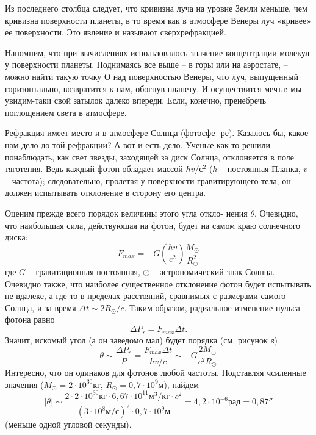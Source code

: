 \begin{multicols}{2}
        \normalsize
        \par
        Из последнего столбца следует, что кривизна луча на уровне Земли меньше, чем кривизна поверхности планеты, в то время как в атмосфере Венеры луч «кривее» ее поверхности. Это явление и называют сверхрефракцией.
        \par
        Напомним, что при вычислениях использовалось значение концентрации молекул у поверхности планеты. Поднимаясь все выше – в горы или на аэростате, – можно найти такую точку О над поверхностью Венеры, что луч, выпущенный горизонтально, возвратится к нам, обогнув планету. И осуществится мечта: мы увидим-таки свой затылок далеко впереди. Если, конечно, пренебречь поглощением света в атмосфере.
        \par
        Рефракция имеет место и в атмосфере Солнца (фотосфе- ре). Казалось бы, какое нам дело до той рефракции? А вот и есть дело. Ученые как-то решили понаблюдать, как свет звезды, заходящей за диск Солнца, отклоняется в поле тяготения. Ведь каждый фотон обладает массой $hv/\textit{с}^2$
        ($h$ – постоянная Планка, $v$ – частота); следовательно, пролетая у поверхности гравитирующего тела, он должен испытывать отклонение в сторону его центра.
        \par
        Оценим прежде всего порядок величины этого угла откло- нения $\theta$. Очевидно, что наибольшая сила, действующая на фотон, будет на самом краю солнечного диска:
        \begin{equation*}
            F_{max}=-G\left(\frac{hv}{c^2}\right)\frac{M_{\odot}}{R_{\odot}^2}
        \end{equation*}
        где $G$ – гравитационная постоянная, $\odot$ – астрономический знак Солнца. Очевидно также, что наиболее существенное отклонение фотон будет испытывать не вдалеке, а где-то в пределах расстояний, сравнимых с размерами самого Солнца, и за время $\Delta t \sim 2 R_{\odot}/c $.
        Таким образом, радиальное изменение пульса фотона равно
        \begin{equation*}
            \Delta P_{r}=F_{max}\Delta t.
        \end{equation*}
        Значит, искомый угол (а он заведомо мал) будет порядка (см. рисунок \emph{в})
        \begin{equation*}
            \theta \sim \frac{\Delta P_{r} }{P} = \frac{F_{max}\Delta t}{hv/c} \sim - G \frac{2M_{\odot}}{c^2 R_\odot}
        \end{equation*}
        Интересно, что он одинаков для фотонов любой частоты. Подставляя чсиленные значения ($M_{\odot} = 2 \cdotp 10^{30} \textit{кг} $, $R_{\odot} = 0,7 \cdotp 10^9 \textit{м} $), найдем
        \begin{equation*}
            |\theta| \sim \frac{2 \cdotp 2 \cdotp 10^{30} \textit{кг} \cdotp 6,67 \cdotp 10^{11} \textit{м}^3 / \textit{кг} \cdotp \textit{c}^2}
            {\left(3 \cdotp 10^8 \textit{м}/\textit{с} \right)^2 \cdotp 0,7 \cdotp 10^9 \textit{м}} = 4,2 \cdotp 10^{-6} \textit{рад} = 0,87''
        \end{equation*}
        (меньше одной угловой секунды). 
        

\end{multicols}
